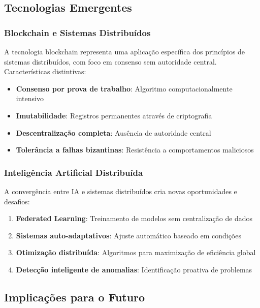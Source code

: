\subsection{Tecnologias Emergentes}

\subsubsection{Blockchain e Sistemas Distribuídos}

A tecnologia blockchain representa uma aplicação específica dos princípios de sistemas distribuídos, com foco em consenso sem autoridade central. Características distintivas:

\begin{itemize}
    \item \textbf{Consenso por prova de trabalho}: Algoritmo computacionalmente intensivo
    \item \textbf{Imutabilidade}: Registros permanentes através de criptografia
    \item \textbf{Descentralização completa}: Ausência de autoridade central
    \item \textbf{Tolerância a falhas bizantinas}: Resistência a comportamentos maliciosos
\end{itemize}

\subsubsection{Inteligência Artificial Distribuída}

A convergência entre IA e sistemas distribuídos cria novas oportunidades e desafios:

\begin{enumerate}
    \item \textbf{Federated Learning}: Treinamento de modelos sem centralização de dados
    \item \textbf{Sistemas auto-adaptativos}: Ajuste automático baseado em condições
    \item \textbf{Otimização distribuída}: Algoritmos para maximização de eficiência global
    \item \textbf{Detecção inteligente de anomalias}: Identificação proativa de problemas
\end{enumerate}

\subsection{Implicações para o Futuro}


